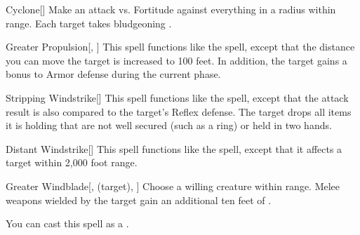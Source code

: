 \lowercase{\hypertarget{spell:Cyclone}{}}\label{spell:Cyclone}
\begin{freeability}[\nth{2}]{\hypertarget{spell:Cyclone}{Cyclone}}[]
Make an attack vs. Fortitude against everything in a \areasmall radius within \rngclose range.
\hit Each target takes bludgeoning .
\end{freeability}
\vspace{0.25em}



\lowercase{\hypertarget{spell:Greater Propulsion}{}}\label{spell:Greater Propulsion}
\begin{freeability}[\nth{2}]{\hypertarget{spell:Greater Propulsion}{Greater Propulsion}}[, ]
This spell functions like the  spell, except that the distance you can move the target is increased to 100 feet.
In addition, the target gains a  bonus to Armor defense during the current phase.
\end{freeability}
\vspace{0.25em}



\lowercase{\hypertarget{spell:Stripping Windstrike}{}}\label{spell:Stripping Windstrike}
\begin{freeability}[\nth{2}]{\hypertarget{spell:Stripping Windstrike}{Stripping Windstrike}}[]
This spell functions like the  spell, except that the attack result is also compared to the target's Reflex defense.
\hit The target drops all items it is holding that are not well secured (such as a ring) or held in two hands.
\end{freeability}
\vspace{0.25em}



\lowercase{\hypertarget{spell:Distant Windstrike}{}}\label{spell:Distant Windstrike}
\begin{freeability}[\nth{3}]{\hypertarget{spell:Distant Windstrike}{Distant Windstrike}}[]
This spell functions like the  spell, except that it affects a target within 2,000 foot range.
\end{freeability}
\vspace{0.25em}



\lowercase{\hypertarget{spell:Greater Windblade}{}}\label{spell:Greater Windblade}
\begin{attuneability}[\nth{3}]{\hypertarget{spell:Greater Windblade}{Greater Windblade}}[,  (target), ]
Choose a willing creature within \rngclose range.
Melee weapons wielded by the target gain an additional ten feet of .

You can cast this spell as a .
\end{attuneability}
\vspace{0.25em}



